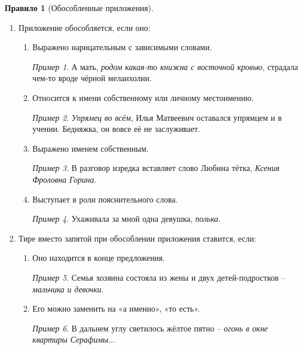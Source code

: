 \documentclass[12pt]{article}
\theoremstyle{definition}
\newtheorem{rrule}{Правило}[section]
\theoremstyle{remark}
\newtheorem*{example}{Пример}
\begin{document}
\begin{rrule}[Обособленные приложения]
    \hfill 
    \begin{enumerate}
        \item Приложение обособляется, если оно:
        \begin{enumerate}
            \item Выражено нарицательным с зависимыми словами.
            \begin{example}
                А мать, \textsl{родом какая-то книжна с восточной кровью}, страдала чем-то вроде чёрной меланхолии.
            \end{example}
            \item Относится к имени собственному или личному местоимению.
            \begin{example}
                \textsl{Упрямец во всём}, Илья Матвеевич оставался упрямцем и в учении. Бедняжка, он вовсе её не заслуживает.
            \end{example}
            \item Выражено именем собственным.
            \begin{example}
                В разговор изредка вставляет слово Любина тётка, \textsl{Ксения Фроловна Горина}.
            \end{example}
            \item Выступает в роли пояснительного слова.
            \begin{example}
                Ухаживала за мной одна девушка, \textsl{полька}.
            \end{example}
        \end{enumerate}
        \item Тире вместо запятой при обособлении приложения ставится, если:
        \begin{enumerate}
            \item Оно находится в конце предложения.
            \begin{example}
                Семья хозяина состояла из жены и двух детей-подростков -- \textsl{мальчика и девочки}.
            \end{example}
            \item Его можно заменить на «а именно», «то есть».
            \begin{example}
                В дальнем углу светилось жёлтое пятно -- \textsl{огонь в окне квартиры Серафимы}...
            \end{example}
        \end{enumerate}
    \end{enumerate}
\end{rrule}
\end{document}
